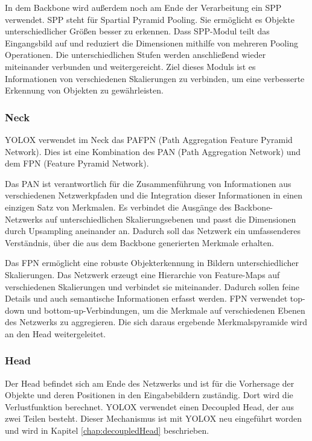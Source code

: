 In dem Backbone wird außerdem noch am Ende der Verarbeitung ein SPP verwendet. SPP steht für Spartial Pyramid Pooling. Sie ermöglicht es Objekte unterschiedlicher Größen besser zu erkennen. Dass SPP-Modul teilt das Eingangsbild auf und reduziert die Dimensionen mithilfe von mehreren Pooling Operationen. Die unterschiedlichen Stufen werden anschließend wieder miteinander verbunden und weitergereicht. Ziel dieses Moduls ist es Informationen von verschiedenen Skalierungen zu verbinden, um eine verbesserte Erkennung von Objekten zu gewährleisten. \cite{yoloxBackbone}

\subsubsection{Neck}
YOLOX verwendet im Neck das PAFPN (Path Aggregation Feature Pyramid Network). Dies ist eine Kombination des PAN (Path Aggregation Network) und dem FPN (Feature Pyramid Network). 

Das PAN ist verantwortlich für die Zusammenführung von Informationen aus verschiedenen Netzwerkpfaden und die Integration dieser Informationen in einen einzigen Satz von Merkmalen. Es verbindet die Ausgänge des Backbone-Netzwerks auf unterschiedlichen Skalierungsebenen und passt die Dimensionen durch Upsampling aneinander an. Dadurch soll das Netzwerk ein umfassenderes Verständnis, über die aus dem Backbone generierten Merkmale erhalten.

Das FPN ermöglicht eine robuste Objekterkennung in Bildern unterschiedlicher Skalierungen. Das Netzwerk erzeugt eine Hierarchie von Feature-Maps auf verschiedenen Skalierungen und verbindet sie miteinander. Dadurch sollen feine Details und auch semantische Informationen erfasst werden. FPN verwendet top-down und bottom-up-Verbindungen, um die Merkmale auf verschiedenen Ebenen des Netzwerks zu aggregieren. Die sich daraus ergebende Merkmalspyramide wird an den Head weitergeleitet. \cite{yoloxNeckPAN, yoloxNeckFPN}


\subsubsection{Head}
Der Head befindet sich am Ende des Netzwerks und ist für die Vorhersage der Objekte und deren Positionen in den Eingabebildern zuständig. Dort wird die Verlustfunktion berechnet. YOLOX verwendet einen Decoupled Head, der aus zwei Teilen besteht. Dieser Mechanismus ist mit YOLOX neu eingeführt worden und wird in Kapitel \ref{chap:decoupledHead} beschrieben.


